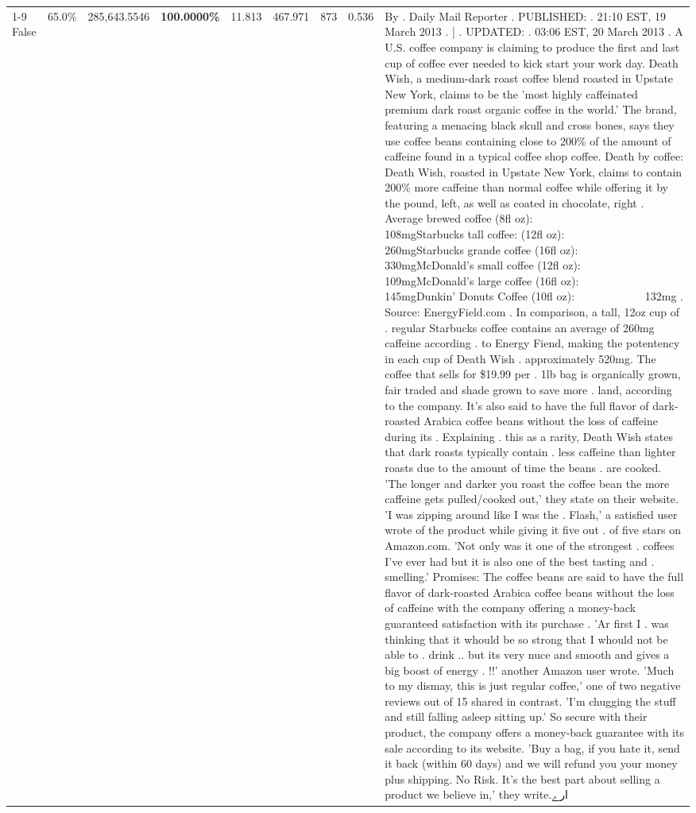 \begin{table}[H]
{\begin{tabular}{lllrlllll}
\cline{1-9}
False & 65.0\% & 285,643.5546 & \bfseries \color{red} 100.0000\% & 11.813 & 467.971 & 873 & 0.536 & By . Daily Mail Reporter . PUBLISHED: . 21:10 EST, 19 March 2013 . | . UPDATED: . 03:06 EST, 20 March 2013 . A U.S. coffee company is claiming to produce the first and last cup of coffee ever needed to kick start your work day. Death Wish, a medium-dark roast coffee blend roasted in Upstate New York, claims to be the 'most highly caffeinated premium dark roast organic coffee in the world.' The brand, featuring a menacing black skull and cross bones, says they use coffee beans containing close to 200\% of the amount of caffeine found in a typical coffee shop coffee. Death by coffee: Death Wish, roasted in Upstate New York, claims to contain 200\% more caffeine than normal coffee while offering it by the pound, left, as well as coated in chocolate, right . Average brewed coffee (8fl oz):              108mgStarbucks tall coffee: (12fl oz):                260mgStarbucks grande coffee (16fl oz):         330mgMcDonald's small coffee (12fl oz):           109mgMcDonald's large coffee (16fl oz):           145mgDunkin' Donuts Coffee (10fl oz):             132mg . Source: EnergyField.com . In comparison, a tall, 12oz cup of . regular Starbucks coffee contains an average of 260mg caffeine according . to Energy Fiend, making the potentency in each cup of Death Wish . approximately 520mg. The coffee that sells for \$19.99 per . 1lb bag is organically grown, fair traded and shade grown to save more . land, according to the company. It's also said to have the full flavor of dark-roasted Arabica coffee beans without the loss of caffeine during its . Explaining . this as a rarity, Death Wish states that dark roasts typically contain . less caffeine than lighter roasts due to the amount of time the beans . are cooked. 'The longer and darker you roast the coffee bean the more caffeine gets pulled/cooked out,' they state on their website. 'I was zipping around like I was the . Flash,' a satisfied user wrote of the product while giving it five out . of five stars on Amazon.com. 'Not only was it one of the strongest . coffees I've ever had but it is also one of the best tasting and . smelling.’ Promises: The coffee beans are said to have the full flavor of dark-roasted Arabica coffee beans without the loss of caffeine with the company offering a money-back guaranteed satisfaction with its purchase . 'Ar first I . was thinking that it whould be so strong that I whould not be able to . drink .. but its very nuce and smooth and gives a big boost of energy . !!' another Amazon user wrote. 'Much to my dismay, this is just regular coffee,' one of two negative reviews out of 15 shared in contrast. 'I'm chugging the stuff and still falling asleep sitting up.' So secure with their product, the company offers a money-back guarantee with its sale according to its website. 'Buy a bag, if you hate it, send it back (within 60 days) and we will refund you your money plus shipping. No Risk. It’s the best part about selling a product we believe in,' they write.ارے \\

\end{tabular}}
\end{table}
